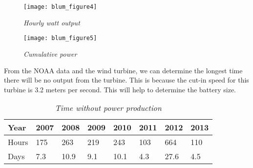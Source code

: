 \begin{figure}
\centering
\texttt{[image: blum\_figure4]}
\caption{\textit{Hourly watt output}}
\label{fig:Hourly output in watts}
\end{figure}


\begin{figure}
\centering
\texttt{[image: blum\_figure5]}
\caption{\textit{Cumulative power}}
\label{fig: Cumlative power}
\end{figure}

From the NOAA data and the wind turbine, we can determine the longest time there will be no output from the turbine. This is because the cut-in speed for this turbine is 3.2 meters per second. This will help to determine the battery size. 

\begin{table}
\centering
\begin{tabular}{|l|l|l|l|l|l|l|l|}\hline
Year & 2007 & 2008 & 2009 & 2010 & 2011 & 2012 &2013\\\hline
Hours & 175 & 263 & 219 & 243 & 103 & 664 & 110\\\hline
Days & 7.3 & 10.9 & 9.1 & 10.1 & 4.3 & 27.6& 4.5\\\hline
\end{tabular}
\caption{\textit{Time without power production}}
\label{tab:widgets}
\end{table}

